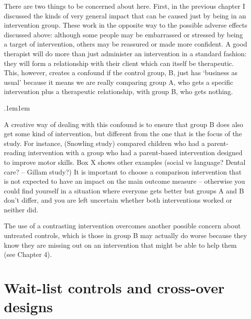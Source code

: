 \documentclass[]{book}
\begin{document}
There are two things to be concerned about here. First, in the previous chapter I discussed the kinds of very general impact that can be caused just by being in an intervention group. These work in the opposite way to the possible adverse effects discussed above: although some people may be embarrassed or stressed by being a target of intervention, others may be reassured or made more confident. A good therapist will do more than just administer an intervention in a standard fashion: they will form a relationship with their client which can itself be therapeutic. This, however, creates a confound if the control group, B, just has `business as usual' because it means we are really comparing group A, who gets a specific intervention plus a therapeutic relationship, with group B, who gets nothing.

\sffamily\fboxrule.1em\fboxsep1em

A creative way of dealing with this confound is to ensure that group B does also get some kind of intervention, but different from the one that is the focus of the study. For instance, (Snowling study) compared children who had a parent-reading intervention with a group who had a parent-based intervention designed to improve motor skills. Box X shows other examples (social vs language? Dental care? -- Gillam study?) It is important to choose a comparison intervention that is not expected to have an impact on the main outcome measure -- otherwise you could find yourself in a situation where everyone gets better but groups A and B don't differ, and you are left uncertain whether both interventions worked or neither did.

The use of a contrasting intervention overcomes another possible concern about untreated controls, which is those in group B may actually do worse because they know they are missing out on an intervention that might be able to help them (see Chapter 4).

\hypertarget{wait-list-controls-and-cross-over-designs}{%
\section{Wait-list controls and cross-over designs}\label{wait-list-controls-and-cross-over-designs}}
\end{document}
